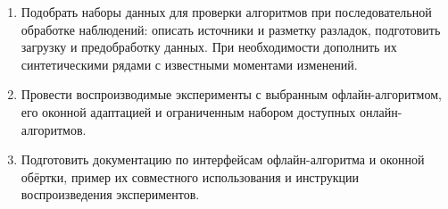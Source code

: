 \begin{enumerate}
    \item Подобрать наборы данных для проверки алгоритмов
    при последовательной обработке наблюдений: описать источники
    и разметку разладок, подготовить загрузку и предобработку данных.
    При необходимости дополнить их синтетическими рядами
    с известными моментами изменений.

    \item Провести воспроизводимые эксперименты с выбранным
    офлайн-алгоритмом, его оконной адаптацией и ограниченным набором
    доступных онлайн-алгоритмов.

    \item Подготовить документацию по интерфейсам офлайн-алгоритма
    и оконной обёртки, пример их совместного использования
    и инструкции воспроизведения экспериментов.
\end{enumerate}

